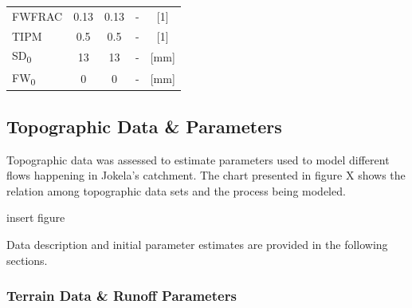 \begin{table}[h]
\begin{tabular}{lcccc}
FWFRAC             & 0.13                                                                                       & 0.13                                                                                       & -                                                                                                 & {[}1{]}             \\
TIPM               & 0.5                                                                                        & 0.5                                                                                        & -                                                                                                 & {[}1{]}             \\
SD\textsubscript{0}                & 13                                                                                         & 13                                                                                         & -                                                                                                 & {[}mm{]}            \\
FW\textsubscript{0}                & 0                                                                                          & 0                                                                                          & -                                                                                                 & {[}mm{]}           
\end{tabular}
\end{table}

        

\subsection{Topographic Data \& Parameters}

Topographic data was assessed to estimate parameters used to model different flows happening in Jokela's catchment. The chart presented in figure X shows the relation among topographic data sets and the process being modeled. 

insert figure

Data description and initial parameter estimates are provided in the following sections. 

\subsubsection{Terrain Data \& Runoff Parameters} \label{runoffcs}
    
